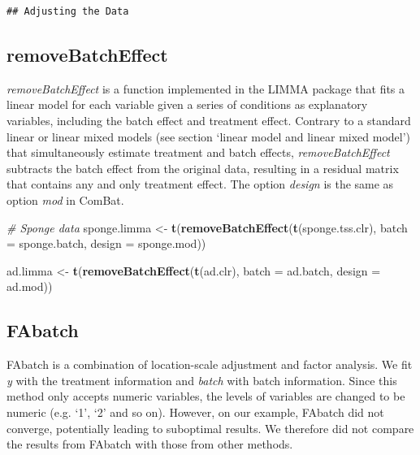 \documentclass[]{book}
\newenvironment{Shaded}{\begin{snugshade}}{\end{snugshade}}
\newcommand{\KeywordTok}[1]{\textcolor[rgb]{0.13,0.29,0.53}{\textbf{#1}}}
\newcommand{\DataTypeTok}[1]{\textcolor[rgb]{0.13,0.29,0.53}{#1}}
\newcommand{\StringTok}[1]{\textcolor[rgb]{0.31,0.60,0.02}{#1}}
\newcommand{\CommentTok}[1]{\textcolor[rgb]{0.56,0.35,0.01}{\textit{#1}}}
\newcommand{\NormalTok}[1]{#1}
\begin{document}
\begin{verbatim}
## Adjusting the Data
\end{verbatim}

\subsection{removeBatchEffect}\label{removebatcheffect}

\emph{removeBatchEffect} is a function implemented in the LIMMA package
that fits a linear model for each variable given a series of conditions
as explanatory variables, including the batch effect and treatment
effect. Contrary to a standard linear or linear mixed models (see
section `linear model and linear mixed model') that simultaneously
estimate treatment and batch effects, \emph{removeBatchEffect} subtracts
the batch effect from the original data, resulting in a residual matrix
that contains any and only treatment effect. The option \emph{design} is
the same as option \emph{mod} in ComBat.

\begin{Shaded}
\begin{Highlighting}[]
\CommentTok{# Sponge data}
\NormalTok{sponge.limma <-}\StringTok{ }\KeywordTok{t}\NormalTok{(}\KeywordTok{removeBatchEffect}\NormalTok{(}\KeywordTok{t}\NormalTok{(sponge.tss.clr), }\DataTypeTok{batch =}\NormalTok{ sponge.batch, }
                                    \DataTypeTok{design =}\NormalTok{ sponge.mod))}
\end{Highlighting}
\end{Shaded}

\begin{Shaded}
\begin{Highlighting}[]
\NormalTok{ad.limma <-}\StringTok{ }\KeywordTok{t}\NormalTok{(}\KeywordTok{removeBatchEffect}\NormalTok{(}\KeywordTok{t}\NormalTok{(ad.clr), }\DataTypeTok{batch =}\NormalTok{ ad.batch, }
                                \DataTypeTok{design =}\NormalTok{ ad.mod))}
\end{Highlighting}
\end{Shaded}

\subsection{FAbatch}\label{fabatch}

FAbatch is a combination of location-scale adjustment and factor
analysis. We fit \emph{y} with the treatment information and
\emph{batch} with batch information. Since this method only accepts
numeric variables, the levels of variables are changed to be numeric
(e.g. `1', `2' and so on). However, on our example, FAbatch did not
converge, potentially leading to suboptimal results. We therefore did
not compare the results from FAbatch with those from other methods.
\end{document}
